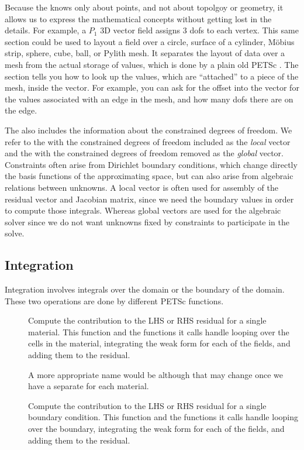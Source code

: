 Because the  knows only about points, and not
about topolgoy or geometry, it allows us to express the mathematical
concepts without getting lost in the details. For example, a $P_1$ 3D
vector field assigns 3 dofs to each vertex. This same section could be
used to layout a field over a circle, surface of a cylinder, M\"obius
strip, sphere, cube, ball, or Pylith mesh. It separates the layout of
data over a mesh from the actual storage of values, which is done by a
plain old PETSc . The section tells you how to look up the
values, which are ``attached'' to a piece of the mesh, inside the
vector. For example, you can ask for the offset into the vector for
the values associated with an edge in the mesh, and how many dofs
there are on the edge.

The  also includes the information about the
constrained degrees of freedom. We refer to the  with
the constrained degrees of freedom included as the {\em local} vector
and the  with the constrained degrees of freedom
removed as the {\em global} vector. Constraints often arise from
Dirichlet boundary conditions, which change directly the basis
functions of the approximating space, but can also arise from
algebraic relations between unknowns. A local vector is often used for
assembly of the residual vector and Jacobian matrix, since we need the
boundary values in order to compute those integrals. Whereas global
vectors are used for the algebraic solver since we do not want
unknowns fixed by constraints to participate in the solve.


\subsection{Integration}

Integration involves integrals over the domain or the boundary of the
domain. These two operations are done by different PETSc functions.

\begin{description}
\item[] Compute the
  contribution to the LHS or RHS residual for a single material. This
  function and the functions it calls handle looping over the cells in
  the material, integrating the weak form for each of the fields, and
  adding them to the residual.

  A more appropriate name would be
   although that may change once
  we have a separate  for each material.
%
\item[] Compute the contribution
  to the LHS or RHS residual for a single boundary condition. This
  function and the functions it calls handle looping over the
  boundary, integrating the weak form for each of the fields, and
  adding them to the residual.
\end{description}

